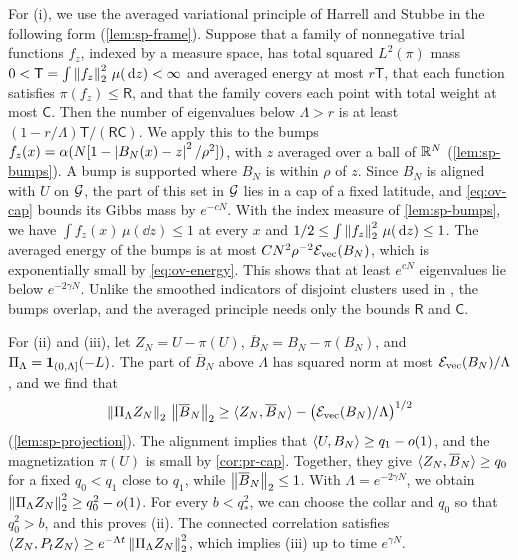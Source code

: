 For (i), we use the averaged variational principle of Harrell and Stubbe \cite[Theorem~3.1]{HarrellStubbe2014} in the following form (\cref{lem:sp-frame}). Suppose that a family of nonnegative trial functions $f_z$, indexed by a measure space, has total squared $L^2(\pi)$ mass $0<\mathsf T=\int\left\lVert f_z\right\rVert_2^2\,\mu(\,\mathrm d z)<\infty$ and averaged energy at most $r\mathsf T$, that each function satisfies $\pi(f_z)\le\mathsf R$, and that the family covers each point with total weight at most $\mathsf C$. Then the number of eigenvalues below $\Lambda>r$ is at least $(1-r/\Lambda)\mathsf T/(\mathsf R\mathsf C)$. We apply this to the bumps $f_z(x)=\alpha(N[1-\left|B_N(x)-z\right|^2/\rho^2])$, with $z$ averaged over a ball of $\mathbb R^N$ (\cref{lem:sp-bumps}). A bump is supported where $B_N$ is within $\rho$ of $z$. Since $B_N$ is aligned with $U$ on $\mathcal G$, the part of this set in $\mathcal G$ lies in a cap of a fixed latitude, and \eqref{eq:ov-cap} bounds its Gibbs mass by $e^{-cN}$. With the index measure of \cref{lem:sp-bumps}, we have $\int f_z(x)\,\mu(\dd z)\le1$ at every $x$ and $1/2\le\int\left\lVert f_z\right\rVert_2^2\,\mu(\,\mathrm d z)\le1$. The averaged energy of the bumps is at most $CN^2\rho^{-2}\mathcal E_{\rm vec}(B_N)$, which is exponentially small by \eqref{eq:ov-energy}. This shows that at least $e^{cN}$ eigenvalues lie below $e^{-2\gamma N}$. Unlike the smoothed indicators of disjoint clusters used in \cite{ElAlaouiMontanariSellke2025}, the bumps overlap, and the averaged principle needs only the bounds $\mathsf R$ and $\mathsf C$.

For (ii) and (iii), let $Z_N=U-\pi(U)$, $\overline B_N=B_N-\pi(B_N)$, and $\Pi_\Lambda=\mathbf 1_{(0,\Lambda]}(-L)$. The part of $\overline B_N$ above $\Lambda$ has squared norm at most $\mathcal E_{\rm vec}(B_N)/\Lambda$, and we find that
\begin{equation}\label{eq:ov-projection}
\left\lVert\Pi_\Lambda Z_N\right\rVert_2\,\left\lVert\overline B_N\right\rVert_2\ge\langle Z_N,\overline B_N\rangle-\bigl(\mathcal E_{\rm vec}(B_N)/\Lambda\bigr)^{1/2}
\end{equation}
(\cref{lem:sp-projection}). The alignment implies that $\langle U,B_N\rangle\ge q_1-o(1)$, and the magnetization $\pi(U)$ is small by \cref{cor:pr-cap}. Together, they give $\langle Z_N,\overline B_N\rangle\ge q_0$ for a fixed $q_0<q_1$ close to $q_1$, while $\left\lVert\overline B_N\right\rVert_2\le1$. With $\Lambda=e^{-2\gamma N}$, we obtain $\left\lVert\Pi_\Lambda Z_N\right\rVert_2^2\ge q_0^2-o(1)$. For every $b<q_*^2$, we can choose the collar and $q_0$ so that $q_0^2>b$, and this proves (ii). The connected correlation satisfies $\langle Z_N,P_tZ_N\rangle\ge e^{-\Lambda t}\left\lVert\Pi_\Lambda Z_N\right\rVert_2^2$, which implies (iii) up to time $e^{\gamma N}$.

